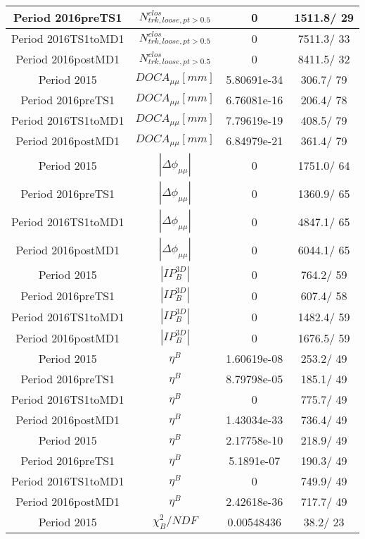 \documentclass{article}
\begin{document}
\begin{longtable}{c|c|c|c}
\hline
 Period 2016preTS1 & $N^{clos}_{trk, loose, pt>0.5}$ & 0 & 1511.8/ 29\\
\hline
 Period 2016TS1toMD1 & $N^{clos}_{trk, loose, pt>0.5}$ & 0 & 7511.3/ 33\\
\hline
 Period 2016postMD1 & $N^{clos}_{trk, loose, pt>0.5}$ & 0 & 8411.5/ 32\\
\hline
 Period 2015 & $DOCA_{\mu\mu} [mm]$ & 5.80691e-34 & 306.7/ 79\\
\hline
 Period 2016preTS1 & $DOCA_{\mu\mu} [mm]$ & 6.76081e-16 & 206.4/ 78\\
\hline
 Period 2016TS1toMD1 & $DOCA_{\mu\mu} [mm]$ & 7.79619e-19 & 408.5/ 79\\
\hline
 Period 2016postMD1 & $DOCA_{\mu\mu} [mm]$ & 6.84979e-21 & 361.4/ 79\\
\hline
 Period 2015 & $|\Delta\phi_{\mu\mu}|$ & 0 & 1751.0/ 64\\
\hline
 Period 2016preTS1 & $|\Delta\phi_{\mu\mu}|$ & 0 & 1360.9/ 65\\
\hline
 Period 2016TS1toMD1 & $|\Delta\phi_{\mu\mu}|$ & 0 & 4847.1/ 65\\
\hline
 Period 2016postMD1 & $|\Delta\phi_{\mu\mu}|$ & 0 & 6044.1/ 65\\
\hline
 Period 2015 & $|IP_{B}^{3D}|$ & 0 & 764.2/ 59\\
\hline
 Period 2016preTS1 & $|IP_{B}^{3D}|$ & 0 & 607.4/ 58\\
\hline
 Period 2016TS1toMD1 & $|IP_{B}^{3D}|$ & 0 & 1482.4/ 59\\
\hline
 Period 2016postMD1 & $|IP_{B}^{3D}|$ & 0 & 1676.5/ 59\\
\hline
 Period 2015 & $\eta^{B}$ & 1.60619e-08 & 253.2/ 49\\
\hline
 Period 2016preTS1 & $\eta^{B}$ & 8.79798e-05 & 185.1/ 49\\
\hline
 Period 2016TS1toMD1 & $\eta^{B}$ & 0 & 775.7/ 49\\
\hline
 Period 2016postMD1 & $\eta^{B}$ & 1.43034e-33 & 736.4/ 49\\
\hline
 Period 2015 & $\eta^{B}$ & 2.17758e-10 & 218.9/ 49\\
\hline
 Period 2016preTS1 & $\eta^{B}$ & 5.1891e-07 & 190.3/ 49\\
\hline
 Period 2016TS1toMD1 & $\eta^{B}$ & 0 & 749.9/ 49\\
\hline
 Period 2016postMD1 & $\eta^{B}$ & 2.42618e-36 & 717.7/ 49\\
\hline
 Period 2015 & $\chi^{2}_{B}/NDF$ & 0.00548436 &  38.2/ 23\\

\end{longtable}
\end{document}
